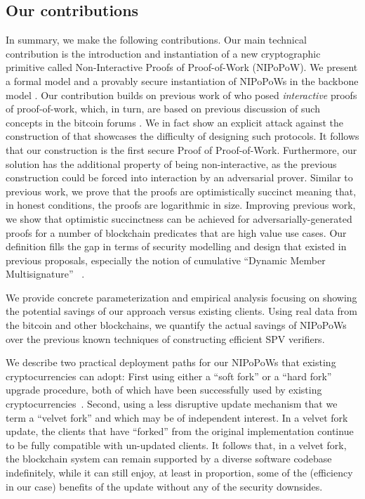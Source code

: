 \subsection{Our contributions}
In summary, we make the following contributions.
Our main technical contribution is the introduction and instantiation
of a new cryptographic
primitive called Non-Interactive Proofs of Proof-of-Work (NIPoPoW).
%
We present a formal model and a provably secure instantiation of NIPoPoWs in the
backbone model \cite{backbone}. Our contribution builds on previous work  of \cite{KLS} who posed {\em interactive} proofs of proof-of-work, which, in turn,
are based on previous discussion of such concepts in the bitcoin forums
\cite{highway}. We in fact show an explicit attack against the construction of \cite{KLS} that showcases the difficulty of designing such protocols. It follows
that our construction is the first secure Proof of Proof-of-Work.
Furthermore, our solution has the additional property of being non-interactive,
as the previous construction could be forced into interaction by an adversarial
prover. Similar to previous work, we prove that the proofs are
optimistically succinct meaning that, in honest conditions, the proofs are
logarithmic in size. Improving previous work, we show that optimistic
succinctness can be achieved for adversarially-generated proofs for a number
of blockchain predicates that are high value use cases. Our definition
fills the gap in terms of security modelling and design that existed in previous
proposals, especially the notion of cumulative ``Dynamic Member Multisignature''
~\cite{sidechains}.

We provide concrete parameterization and empirical analysis focusing on showing
the potential savings of our approach versus existing clients. Using real data
from the bitcoin and other blockchains, we quantify the actual savings of
NIPoPoWs over the previous known techniques of constructing efficient SPV
verifiers.

We describe two practical deployment paths for our NIPoPoWs that existing
cryptocurrencies can adopt: First using either a ``soft fork'' or a ``hard
fork'' upgrade procedure, both of which have been successfully used by existing
cryptocurrencies~\cite{sok}. Second, using a less disruptive update mechanism
that we term a ``velvet fork'' and which may be of independent interest. In a
velvet fork update, the clients that have ``forked'' from the original
implementation continue to be fully compatible with un-updated clients. It
follows that, in a velvet fork, the blockchain system can remain supported by a
diverse software codebase indefinitely, while it can still enjoy, at least in
proportion, some of the (efficiency in our case) benefits of the update without
any of the security downsides.
